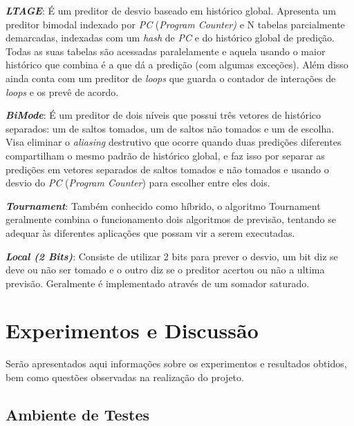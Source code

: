 \documentclass[12pt]{article}
\begin{document}
\begin{description}
\item \textbf{\textit{LTAGE}}: É um preditor de desvio baseado em histórico global. Apresenta um preditor bimodal indexado por \textit{PC} (\textit{Program Counter)} 
e N tabelas parcialmente demarcadas, indexadas com um \textit{hash} de \textit{PC} e do histórico global de predição. Todas as suas tabelas são acessadas
paralelamente e aquela usando o maior histórico que combina é a que dá a predição (com algumas exceções). Além disso ainda conta com um preditor de 
\textit{loops} que guarda o contador de interações de \textit{loops} e os prevê de acordo.

\item \textbf{\textit{BiMode}}: É um preditor de dois níveis que possui três vetores de histórico separados: um de saltos tomados, um de saltos não tomados e um 
de escolha. Visa eliminar o \textit{aliasing} destrutivo que ocorre quando duas predições diferentes compartilham o mesmo padrão de histórico global, e 
faz isso por separar as predições em vetores separados de saltos tomados e não tomados e usando o desvio do \textit{PC} (\textit{Program Counter}) para escolher 
entre eles dois.

\item \textbf{\textit{Tournament}}: Também conhecido como híbrido, o algoritmo Tournament geralmente combina o funcionamento dois algoritmos
de previsão, tentando se adequar às diferentes aplicações que possam vir a serem executadas.

\item \textbf{\textit{Local (2 Bits)}}: Consiste de utilizar 2 bits para prever o desvio, um bit diz se deve ou não ser tomado e o outro diz se
o preditor acertou ou não a ultima previsão. Geralmente é implementado através de um somador saturado.
\end{description}

\section{Experimentos e Discussão}
Serão apresentados aqui informações sobre os experimentos e resultados obtidos, bem como questões observadas na realização
do projeto.

\subsection{Ambiente de Testes}
\end{document}
